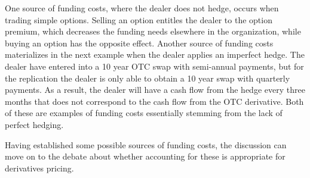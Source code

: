 \documentclass[../../../main.tex]{subfiles}
\begin{document}
        One source of funding costs, where the dealer does not hedge, occurs when trading simple options.
        Selling an option entitles the dealer to the option premium,
        which decreases the funding needs elsewhere in the organization,
        while buying an option has the opposite effect. 
        Another source of funding costs materializes in the next example when the dealer applies an imperfect hedge.
        The dealer have entered into a 10 year OTC swap with semi-annual payments, 
        but for the replication the dealer is only able to obtain a 10 year swap with quarterly payments.
        As a result, the dealer will have a cash flow from the hedge every three months
        that does not correspond to the cash flow from the OTC derivative. 
        Both of these are examples of funding costs essentially stemming from the lack of perfect hedging.

        Having established some possible sources of funding costs, 
        the discussion can move on to the debate about whether accounting for these is appropriate for derivatives pricing.
\end{document}
